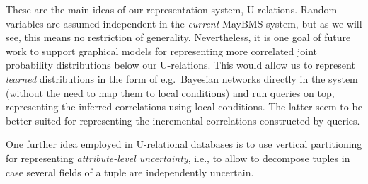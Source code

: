 These are the main ideas of our representation system, U-relations.
Random variables are assumed independent in the {\em current}\/ MayBMS system, but as we will see, this means no restriction of generality.
Nevertheless, it is one goal of future work to support
graphical models for representing more correlated joint probability distributions below our U-relations. This would allow us to represent {\em learned}\/ distributions in the form of e.g.\ Bayesian networks directly in the system (without the need to map them to local conditions) and run queries on top, representing the inferred correlations using local conditions. The latter seem to be better suited for representing the incremental correlations constructed by queries.

One further idea employed in U-relational databases is to use vertical partitioning for representing {\em attribute-level uncertainty}\/, i.e., to allow to decompose tuples in case several fields of a tuple are independently uncertain.



